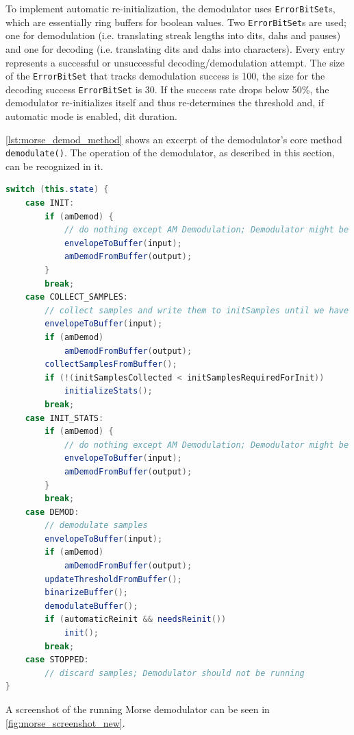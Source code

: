 To implement automatic re-initialization, the demodulator uses \texttt{Er\-ror\-Bit\-Set}s, which are essentially ring buffers for boolean values. Two \texttt{Er\-ror\-Bit\-Set}s are used; one for demodulation (i.e. translating streak lengths into dits, dahs and pauses) and one for decoding (i.e. translating dits and dahs into characters). Every entry represents a successful or unsuccessful decoding/demodulation attempt. The size of the \texttt{Er\-ror\-Bit\-Set} that tracks demodulation success is 100, the size for the decoding success \texttt{Er\-ror\-Bit\-Set} is 30. If the success rate drops below 50\%, the demodulator re-initializes itself and thus re-determines the threshold and, if automatic mode is enabled, dit duration.


\autoref{lst:morse_demod_method} shows an excerpt of the demodulator's core method \texttt{de\-mo\-du\-late()}. The operation of the demodulator, as described in this section, can be recognized in it.

\begin{lstlisting}[label=lst:morse_demod_method, caption=The demodulate method of the new Morse demodulator (excerpt), language=java]
switch (this.state) {
    case INIT:
        if (amDemod) {
            // do nothing except AM Demodulation; Demodulator might be in inconsistent state
            envelopeToBuffer(input);
            amDemodFromBuffer(output);
        }
        break;
    case COLLECT_SAMPLES:
        // collect samples and write them to initSamples until we have enough
        envelopeToBuffer(input);
        if (amDemod)
            amDemodFromBuffer(output);
        collectSamplesFromBuffer();
        if (!(initSamplesCollected < initSamplesRequiredForInit))
            initializeStats();
        break;
    case INIT_STATS:
        if (amDemod) {
            // do nothing except AM Demodulation; Demodulator might be in inconsistent state
            envelopeToBuffer(input);
            amDemodFromBuffer(output);
        }
        break;
    case DEMOD:
        // demodulate samples
        envelopeToBuffer(input);
        if (amDemod)
            amDemodFromBuffer(output);
        updateThresholdFromBuffer();
        binarizeBuffer();
        demodulateBuffer();
        if (automaticReinit && needsReinit())
            init();
        break;
    case STOPPED:
        // discard samples; Demodulator should not be running
}
\end{lstlisting}

A screenshot of the running Morse demodulator can be seen in \autoref{fig:morse_screenshot_new}.

